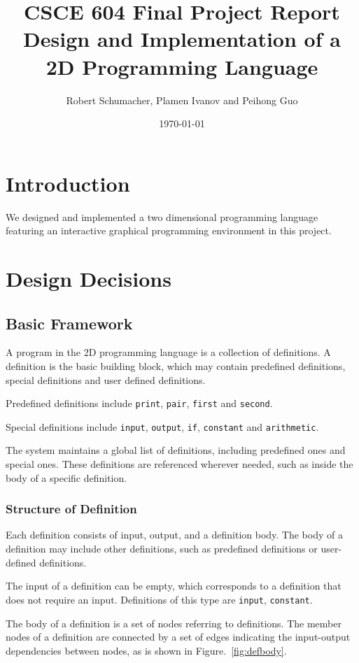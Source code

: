 \documentclass[12pt,UTF8,a4]{article}
\title{CSCE 604 Final Project Report \\ Design and Implementation of a 2D Programming Language}
\author{Robert Schumacher, Plamen Ivanov and Peihong Guo}
\date{\today}
\begin{document}
\maketitle
\singlespacing

\section{Introduction}
We designed and implemented a two dimensional programming language featuring an interactive graphical programming environment in this project.

\section{Design Decisions}
\subsection{Basic Framework}
A program in the 2D programming language is a collection of definitions. A definition is the basic building block, which may contain predefined definitions, special definitions and user defined definitions.

Predefined definitions include \texttt{print}, \texttt{pair}, \texttt{first} and \texttt{second}.

Special definitions include \texttt{input}, \texttt{output}, \texttt{if}, \texttt{constant} and \texttt{arithmetic}.

The system maintains a global list of definitions, including predefined ones and special ones. These definitions are referenced wherever needed, such as inside the body of a specific definition. 

\subsubsection{Structure of Definition}
Each definition consists of input, output, and a definition body. The body of a definition may include other definitions, such as predefined definitions or user-defined definitions.

The input of a definition can be empty, which corresponds to a definition that does not require an input. Definitions of this type are \texttt{input}, \texttt{constant}.

The body of a definition is a set of nodes referring to definitions. The member nodes of a definition are connected by a set of edges indicating the input-output dependencies between nodes, as is shown in Figure.~\ref{fig:defbody}.
\end{document}
